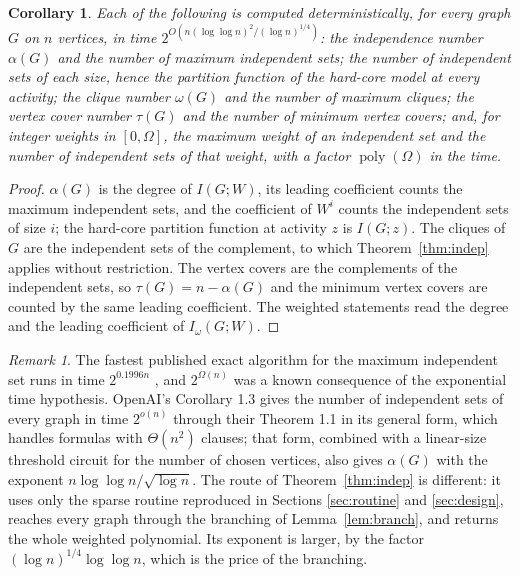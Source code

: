\documentclass[11pt,reqno]{amsart}
\numberwithin{equation}{section}
\theoremstyle{plain}
\newtheorem{corollary}[theorem]{Corollary}
\theoremstyle{definition}
\theoremstyle{remark}
\newtheorem{remark}[theorem]{Remark}
\DeclareMathOperator{\poly}{poly}
\newcommand{\oai}{OpenAI}
\begin{document}
\begin{corollary}\label{cor:indep}
Each of the following is computed deterministically, for every graph $G$ on $n$
vertices, in time $2^{O(n(\log\log n)^2/(\log n)^{1/4})}$: the independence
number $\alpha(G)$ and the number of maximum independent sets; the number of
independent sets of each size, hence the partition function of the hard-core
model at every activity; the clique number $\omega(G)$ and the number of maximum
cliques; the vertex cover number $\tau(G)$ and the number of minimum vertex
covers; and, for integer weights in $[0,\Omega]$, the maximum weight of an
independent set and the number of independent sets of that weight, with a factor
$\poly(\Omega)$ in the time.
\end{corollary}

\begin{proof}
$\alpha(G)$ is the degree of $I(G;W)$, its leading coefficient counts the maximum
independent sets, and the coefficient of $W^{i}$ counts the independent sets of
size $i$; the hard-core partition function at activity $z$ is $I(G;z)$. The
cliques of $G$ are the independent sets of the complement, to which
Theorem~\ref{thm:indep} applies without restriction. The vertex covers are the
complements of the independent sets, so $\tau(G)=n-\alpha(G)$ and the minimum
vertex covers are counted by the same leading coefficient. The weighted
statements read the degree and the leading coefficient of $I_\omega(G;W)$.
\end{proof}

\begin{remark}\label{rem:indep}
The fastest published exact algorithm for the maximum independent set runs in
time $2^{0.1996n}$ \cite{XN17}, and $2^{\Omega(n)}$ was a known consequence of
the exponential time hypothesis. \oai{}'s Corollary 1.3 gives the number of
independent sets of every graph in time $2^{o(n)}$ through their Theorem 1.1 in
its general form, which handles formulas with $\Theta(n^2)$ clauses; that form,
combined with a linear-size threshold circuit for the number of chosen vertices,
also gives $\alpha(G)$ with the exponent $n\log\log n/\sqrt{\log n}$. The route
of Theorem~\ref{thm:indep} is different: it uses only the sparse routine
reproduced in Sections \ref{sec:routine} and \ref{sec:design}, reaches every
graph through the branching of Lemma~\ref{lem:branch}, and returns the whole
weighted polynomial. Its exponent is larger, by the factor
$(\log n)^{1/4}\log\log n$, which is the price of the branching.
\end{remark}
\end{document}
